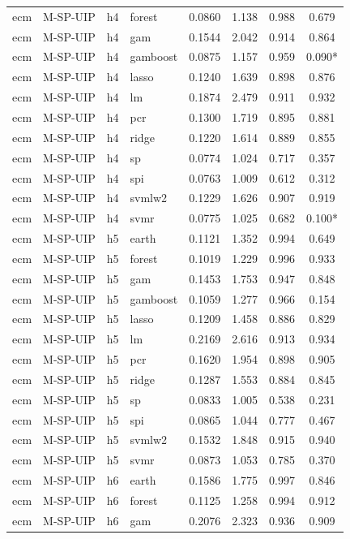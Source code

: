 \begin{ThreePartTable}
\begin{longtable}[t]{llclcccc}
ecm & M-SP-UIP & h4 & forest & 0.0860 & 1.138 & 0.988 & 0.679\\
ecm & M-SP-UIP & h4 & gam & 0.1544 & 2.042 & 0.914 & 0.864\\
ecm & M-SP-UIP & h4 & gamboost & 0.0875 & 1.157 & 0.959 & 0.090*\\
ecm & M-SP-UIP & h4 & lasso & 0.1240 & 1.639 & 0.898 & 0.876\\
ecm & M-SP-UIP & h4 & lm & 0.1874 & 2.479 & 0.911 & 0.932\\
ecm & M-SP-UIP & h4 & pcr & 0.1300 & 1.719 & 0.895 & 0.881\\
ecm & M-SP-UIP & h4 & ridge & 0.1220 & 1.614 & 0.889 & 0.855\\
ecm & M-SP-UIP & h4 & sp & 0.0774 & 1.024 & 0.717 & 0.357\\
ecm & M-SP-UIP & h4 & spi & 0.0763 & 1.009 & 0.612 & 0.312\\
ecm & M-SP-UIP & h4 & svmlw2 & 0.1229 & 1.626 & 0.907 & 0.919\\
ecm & M-SP-UIP & h4 & svmr & 0.0775 & 1.025 & 0.682 & 0.100*\\
\addlinespace
ecm & M-SP-UIP & h5 & earth & 0.1121 & 1.352 & 0.994 & 0.649\\
ecm & M-SP-UIP & h5 & forest & 0.1019 & 1.229 & 0.996 & 0.933\\
ecm & M-SP-UIP & h5 & gam & 0.1453 & 1.753 & 0.947 & 0.848\\
ecm & M-SP-UIP & h5 & gamboost & 0.1059 & 1.277 & 0.966 & 0.154\\
ecm & M-SP-UIP & h5 & lasso & 0.1209 & 1.458 & 0.886 & 0.829\\
ecm & M-SP-UIP & h5 & lm & 0.2169 & 2.616 & 0.913 & 0.934\\
ecm & M-SP-UIP & h5 & pcr & 0.1620 & 1.954 & 0.898 & 0.905\\
ecm & M-SP-UIP & h5 & ridge & 0.1287 & 1.553 & 0.884 & 0.845\\
ecm & M-SP-UIP & h5 & sp & 0.0833 & 1.005 & 0.538 & 0.231\\
ecm & M-SP-UIP & h5 & spi & 0.0865 & 1.044 & 0.777 & 0.467\\
ecm & M-SP-UIP & h5 & svmlw2 & 0.1532 & 1.848 & 0.915 & 0.940\\
ecm & M-SP-UIP & h5 & svmr & 0.0873 & 1.053 & 0.785 & 0.370\\
\addlinespace
ecm & M-SP-UIP & h6 & earth & 0.1586 & 1.775 & 0.997 & 0.846\\
ecm & M-SP-UIP & h6 & forest & 0.1125 & 1.258 & 0.994 & 0.912\\
ecm & M-SP-UIP & h6 & gam & 0.2076 & 2.323 & 0.936 & 0.909\\

\end{longtable}
\end{ThreePartTable}
